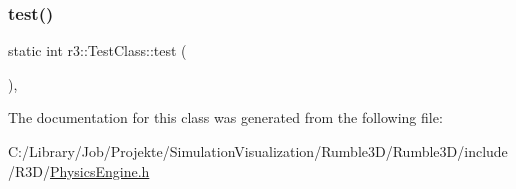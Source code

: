 \subsubsection{\texorpdfstring{test()}{test()}}
{\footnotesize\ttfamily static int r3\+::\+Test\+Class\+::test (\begin{DoxyParamCaption}{ }\end{DoxyParamCaption})\hspace{0.3cm}{\ttfamily [inline]}, {\ttfamily [static]}}



The documentation for this class was generated from the following file\+:\begin{DoxyCompactItemize}
\item 
C\+:/\+Library/\+Job/\+Projekte/\+Simulation\+Visualization/\+Rumble3\+D/\+Rumble3\+D/include/\+R3\+D/\mbox{\hyperlink{_physics_engine_8h}{Physics\+Engine.\+h}}\end{DoxyCompactItemize}
